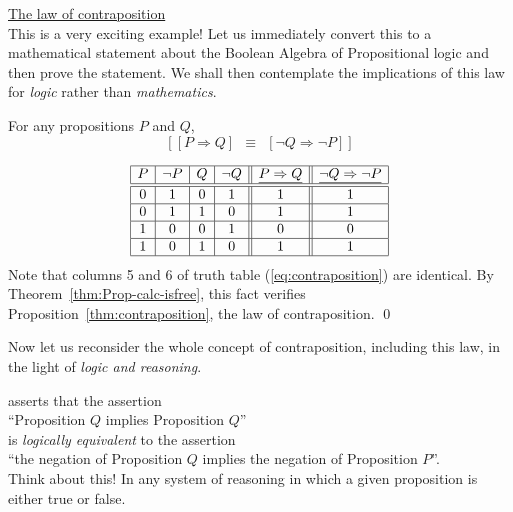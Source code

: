 \bigskip

\noindent 
\underline{\small\sf The law of contraposition} \\
This is a very exciting example!  Let us immediately convert this to a
mathematical statement about the Boolean Algebra of Propositional
logic and then prove the statement.  We shall then contemplate the
implications of this law for {\em logic} rather than {\em mathematics}.

\begin{prop}
\label{thm:contraposition}
For any propositions $P$ and $Q$,
\[  \left[ [ P \Rightarrow Q ] \ \ \equiv \ \ [ \neg Q
    \Rightarrow \neg P ] \right]
\]
\end{prop}

\begin{equation}
\label{eq:contraposition}
\begin{array}{|c|c|c|c||c||c|}
\hline
P & \neg P & Q & \neg Q & \underline{P \Rightarrow Q}
 & \underline{\neg Q \Rightarrow \neg P} \\
\hline
\hline
0 & 1 & 0 & 1 & 1 & 1 \\
\hline
0 & 1 & 1 & 0 & 1 & 1 \\
\hline
1 & 0 & 0 & 1 & 0 & 0 \\
\hline
1 & 0 & 1 & 0 & 1 & 1 \\
\hline
\end{array}
\end{equation}
Note that columns 5 and 6 of truth table (\ref{eq:contraposition}) are
identical.  By Theorem~\ref{thm:Prop-calc-isfree}, this fact verifies
Proposition~\ref{thm:contraposition}, the law of contraposition.
\qed

\smallskip

Now let us reconsider the whole concept of contraposition, including
this law, in the light of {\em logic and reasoning}.

 asserts that the assertion \\
\hspace*{.35in}
``Proposition $Q$ implies Proposition $Q$'' \\
is {\em logically equivalent} to the assertion \\
\hspace*{.35in}
``the negation of Proposition $Q$ implies the negation of Proposition
$P$''.  \\
Think about this!  In any system of reasoning in which a given
proposition is either {\sc true} or {\sc false}.

